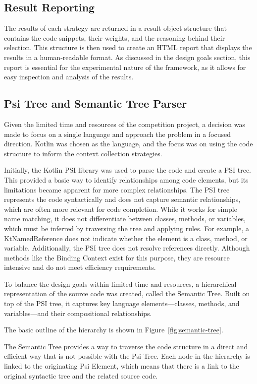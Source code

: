 \documentclass[conference]{IEEEtran}
\begin{document}
\subsection{Result Reporting} 
The results of each strategy are returned in a result object structure that contains the code snippets, 
their weights, and the reasoning behind their selection.  This structure is then used to create an HTML report that
displays the results in a human-readable format.  As discussed in the design goals section, this report is essential for
the experimental nature of the framework, as it allows for easy inspection and analysis of the results.

\subsection{Psi Tree and Semantic Tree Parser}
Given the limited time and resources of the competition project, a decision was made to focus on a single language and approach the problem in a focused direction.  Kotlin 
was chosen as the language, and the focus was on using the code structure to inform the context collection strategies. 

Initially, the Kotlin PSI library was used to parse the code and create a PSI tree. 
This provided a basic way to identify relationships among code elements, but its limitations 
became apparent for more complex relationships. 
The PSI tree represents the code syntactically and does not capture semantic relationships, 
which are often more relevant for code completion. While it works for simple name matching, 
it does not differentiate between classes, methods, or variables, which must be inferred by traversing the tree and applying rules. 
For example, a KtNamedReference does not indicate whether the element is a class, method, or variable. 
Additionally, the PSI tree does not resolve references directly.
Although methods like the Binding Context exist for this purpose, they are resource intensive and do not meet efficiency requirements.

To balance the design goals within limited time and resources, a hierarchical representation of the source code was created, 
called the Semantic Tree. Built on top of the PSI tree, it captures key language elements—classes, methods, and variables—and their 
compositional relationships.

The basic outline of the hierarchy is shown in Figure~\ref{fig:semantic-tree}.

The Semantic Tree provides a way to traverse the code structure in a direct and efficient way that is not 
possible with the Psi Tree.  Each node in the hierarchy is linked to the originating Psi Element, which means that there is a 
link to the original syntactic tree and the related source code.
\end{document}
